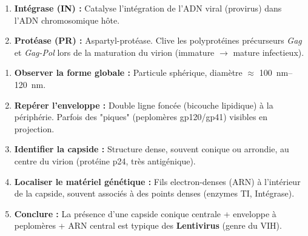 \documentclass[11pt]{article}
\begin{document}
\begin{aretenir}
\begin{itemize}
\begin{itemize}
\begin{enumerate}
            \item \textbf{Intégrase (IN) :} Catalyse l'intégration de l'ADN viral (provirus) dans l'ADN chromosomique hôte.
            \item \textbf{Protéase (PR) :} Aspartyl-protéase. Clive les polyprotéines précurseurs \emph{Gag} et \emph{Gag-Pol} lors de la maturation du virion (immature $\rightarrow$ mature infectieux).
        \end{enumerate}
    \end{itemize}
\end{itemize}
\end{aretenir}

\begin{methode}
\begin{enumerate}
    \item \textbf{Observer la forme globale :} Particule sphérique, diamètre $\approx$ \SI{100}{\nano\meter}--\SI{120}{\nano\meter}.
    \item \textbf{Repérer l'enveloppe :} Double ligne foncée (bicouche lipidique) à la périphérie. Parfois des "piques" (peplomères gp120/gp41) visibles en projection.
    \item \textbf{Identifier la capside :} Structure dense, souvent conique ou arrondie, au centre du virion (protéine p24, très antigénique).
    \item \textbf{Localiser le matériel génétique :} Fils electron-denses (ARN) à l'intérieur de la capside, souvent associés à des points denses (enzymes TI, Intégrase).
    \item \textbf{Conclure :} La présence d'une capside conique centrale + enveloppe à peplomères + ARN central est typique des \textbf{Lentivirus} (genre du VIH).
\end{enumerate}
\end{methode}
\end{document}

